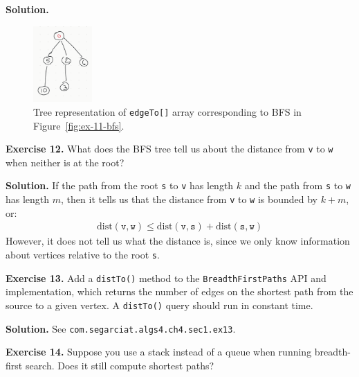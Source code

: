 \documentclass[12pt, a4paper]{article}
\newenvironment{ex}[2][Exercise]
{\par\medskip\noindent \textbf{#1 #2.}}
{\medskip}
\newenvironment{sol}[1][Solution]
{\par\medskip\noindent \textbf{#1.} }
{\medskip}
\begin{document}
	\begin{sol}
		\begin{figure}
			\centering
			\includegraphics[width=0.2\textwidth]{exercise-11-tree}
			\caption{Tree representation of \texttt{edgeTo[]} array corresponding to
				BFS in Figure~\ref{fig:ex-11-bfs}.}
			\label{fig:ex-11-tree}
		\end{figure}
	\end{sol}
	\begin{ex}{12}
		What does the BFS tree tell us about the distance from \texttt{v} to
		\texttt{w} when neither is at the root?
	\end{ex}
	\begin{sol}
		If the path from the root \texttt{s} to \texttt{v} has length $k$ and
		the path from \texttt{s} to \texttt{w} has length $m$, then it tells us
		that the distance from \texttt{v} to \texttt{w} is bounded by $k + m$, or:
		\begin{align*}
			\text{dist}(\texttt{v},\texttt{w}) \leq \text{dist}(\texttt{v}, \texttt{s})
			+\text{dist}(\texttt{s}, \texttt{w})
		\end{align*}
		However, it does not tell us what the distance is, since we only
		know information about vertices relative to the root \texttt{s}.
	\end{sol}
	\begin{ex}{13}
		Add a \texttt{distTo()} method to the \texttt{BreadthFirstPaths} API and implementation,
		which returns the number of edges on the shortest path from the source to a given
		vertex. A \texttt{distTo()} query should run in constant time.
	\end{ex}
	\begin{sol}
		See \texttt{com.segarciat.algs4.ch4.sec1.ex13}.
	\end{sol}
	\begin{ex}{14}
		Suppose you use a stack instead of a queue when running breadth-first search.
		Does it still compute shortest paths?
	\end{ex}
\end{document}
